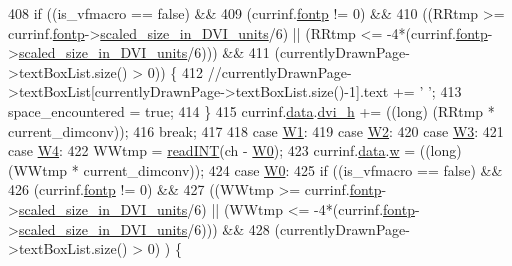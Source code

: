 \begin{DoxyCode}
{408           \textcolor{keywordflow}{if} ((is\_vfmacro == \textcolor{keyword}{false}) &&
409               (currinf.\hyperlink{structdrawinf_a4a6ec248b5b071099ddf9b5e4f0255e2}{fontp} != 0) &&
410               ((RRtmp >= currinf.\hyperlink{structdrawinf_a4a6ec248b5b071099ddf9b5e4f0255e2}{fontp}->\hyperlink{classTeXFontDefinition_a8514a1b74d448c5e9e9dafc8737938e9}{scaled\_size\_in\_DVI\_units}/6) || (RRtmp 
      <= -4*(currinf.\hyperlink{structdrawinf_a4a6ec248b5b071099ddf9b5e4f0255e2}{fontp}->\hyperlink{classTeXFontDefinition_a8514a1b74d448c5e9e9dafc8737938e9}{scaled\_size\_in\_DVI\_units}/6))) &&
411               (currentlyDrawnPage->textBoxList.size() > 0)) \{
412             \textcolor{comment}{//currentlyDrawnPage->textBoxList[currentlyDrawnPage->textBoxList.size()-1].text += ' ';}
413             space\_encountered = \textcolor{keyword}{true};
414           \}
415           currinf.\hyperlink{structdrawinf_af73f66288002f0a25c7843a534bf1340}{data}.\hyperlink{structframedata_a530699c241126f99b81cee11c2c1c4e4}{dvi\_h} += ((long) (RRtmp *  current\_dimconv));
416           \textcolor{keywordflow}{break};
417 
418         \textcolor{keywordflow}{case} \hyperlink{dvi_8h_ab81b2eb602e38a0261e345affe285d6d}{W1}:
419         \textcolor{keywordflow}{case} \hyperlink{dvi_8h_abc37ebbafc333229f88a779e89adf602}{W2}:
420         \textcolor{keywordflow}{case} \hyperlink{dvi_8h_a36f09154c1e0bdd55d6436ef88e43761}{W3}:
421         \textcolor{keywordflow}{case} \hyperlink{dvi_8h_ac33715410b8c1e955a94c40d220b9fa9}{W4}:
422           WWtmp = \hyperlink{classbigEndianByteReader_ad85cb1f2cce7f4de7abc632b5e95223b}{readINT}(ch - \hyperlink{dvi_8h_a5d94134ae98ebb688dc6b0f6d6131b42}{W0});
423           currinf.\hyperlink{structdrawinf_af73f66288002f0a25c7843a534bf1340}{data}.\hyperlink{structframedata_a41ba8896ec8b4ea0765b13c36fd9d18e}{w} = ((long) (WWtmp *  current\_dimconv));
424         \textcolor{keywordflow}{case} \hyperlink{dvi_8h_a5d94134ae98ebb688dc6b0f6d6131b42}{W0}:
425           \textcolor{keywordflow}{if} ((is\_vfmacro == \textcolor{keyword}{false}) &&
426               (currinf.\hyperlink{structdrawinf_a4a6ec248b5b071099ddf9b5e4f0255e2}{fontp} != 0) &&
427               ((WWtmp >= currinf.\hyperlink{structdrawinf_a4a6ec248b5b071099ddf9b5e4f0255e2}{fontp}->\hyperlink{classTeXFontDefinition_a8514a1b74d448c5e9e9dafc8737938e9}{scaled\_size\_in\_DVI\_units}/6) || (WWtmp 
      <= -4*(currinf.\hyperlink{structdrawinf_a4a6ec248b5b071099ddf9b5e4f0255e2}{fontp}->\hyperlink{classTeXFontDefinition_a8514a1b74d448c5e9e9dafc8737938e9}{scaled\_size\_in\_DVI\_units}/6))) &&
428               (currentlyDrawnPage->textBoxList.size() > 0) ) \{
}
\end{DoxyCode}
